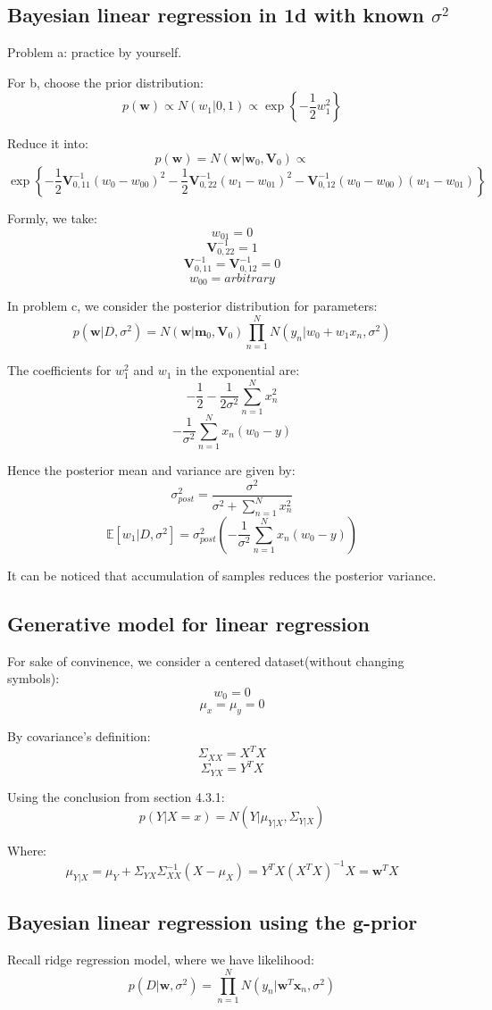 \documentclass[UTF8]{ctexart}
\begin{document}
\subsection{Bayesian linear regression in 1d with known $\sigma^{2}$}
Problem a: practice by yourself.

For b, choose the prior distribution:
$$p(\textbf{w}) \propto N(w_{1}|0,1) \propto \exp\left\{ -\frac{1}{2}w_{1}^{2} \right\}$$

Reduce it into:
$$p(\textbf{w})=N(\textbf{w}|\textbf{w}_{0},\textbf{V}_{0}) \propto $$
$$\exp\left\{ -\frac{1}{2}\textbf{V}_{0,11}^{-1}(w_{0}-w_{00})^{2} - \frac{1}{2}\textbf{V}^{-1}_{0,22}(w_{1}-w_{01})^{2} -\textbf{V}^{-1}_{0,12}(w_{0}-w_{00})(w_{1}-w_{01})\right\}$$

Formly, we take:
$$w_{01}=0$$
$$\textbf{V}_{0,22}^{-1}=1$$
$$\textbf{V}_{0,11}^{-1}=\textbf{V}_{0,12}^{-1}=0$$
$$w_{00}=arbitrary$$

In problem c, we consider the posterior distribution for parameters:
$$p(\textbf{w}|D,\sigma^{2}) =N(\textbf{w}|\textbf{m}_{0},\textbf{V}_{0})\prod_{n=1}^{N}N(y_{n}|w_{0}+w_{1}x_{n},\sigma^{2})$$

The coefficients for $w_{1}^{2}$ and $w_{1}$ in the exponential are:
$$-\frac{1}{2}-\frac{1}{2\sigma^{2}}\sum_{n=1}^{N}x_{n}^{2}$$
$$-\frac{1}{\sigma^{2}}\sum_{n=1}^{N}x_{n}(w_{0}-y)$$

Hence the posterior mean and variance are given by:
$$\sigma^{2}_{post}=\frac{\sigma^{2}}{\sigma^{2}+\sum_{n=1}^{N}x_{n}^{2}}$$
$$\mathbb{E}[w_{1}|D,\sigma^{2}]=\sigma^{2}_{post}(-\frac{1}{\sigma^{2}}\sum_{n=1}^{N}x_{n}(w_{0}-y))$$

It can be noticed that accumulation of samples reduces the posterior variance.

\subsection{Generative model for linear regression}
For sake of convinence, we consider a centered dataset(without changing symbols):
$$w_{0}=0$$
$$\mu_{x}=\mu_{y}=0$$

By covariance's definition:
$$\Sigma_{XX}=X^{T}X$$
$$\Sigma_{YX}=Y^{T}X$$

Using the conclusion from section 4.3.1:
$$p(Y|X=x)=N(Y|\mu_{Y|X},\Sigma_{Y|X})$$

Where:
$$\mu_{Y|X}=\mu_{Y}+\Sigma_{YX}\Sigma_{XX}^{-1}(X-\mu_{X})=Y^{T}X(X^{T}X)^{-1}X=\textbf{w}^{T}X$$

\subsection{Bayesian linear regression using the g-prior}
Recall ridge regression model, where we have likelihood:
$$p(D|\textbf{w},\sigma^{2})=\prod_{n=1}^{N}N(y_{n}|\textbf{w}^{T}\textbf{x}_{n},\sigma^{2})$$
\end{document}
